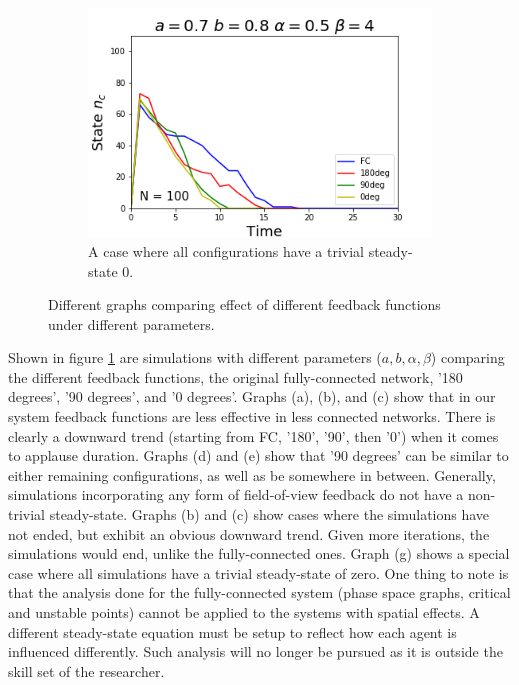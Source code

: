 \begin{figure}[h]
\begin{subfigure}[b]{0.3\linewidth}
    \includegraphics[width=\linewidth]{images/chapter4/feedback_sim7.png}
    \caption{A case where all configurations have a trivial steady-state $0$.}
  \end{subfigure}
  \caption{Different graphs comparing effect of different feedback functions under different parameters.}
  \label{fig:spacesim}
\end{figure}

Shown in figure \ref{fig:spacesim} are simulations with different parameters ($a,b,\alpha,\beta$) comparing the different feedback functions, the original fully-connected network, '180 degrees', '90 degrees', and '0 degrees'.
Graphs (a), (b), and (c) show that in our system feedback functions are less effective in less connected networks. 
There is clearly a downward trend (starting from FC, '180', '90', then '0') when it comes to applause duration.
Graphs (d) and (e) show that '90 degrees' can be similar to either remaining configurations, as well as be somewhere in between.
Generally, simulations incorporating any form of field-of-view feedback do not have a non-trivial steady-state.
Graphs (b) and (c) show cases where the simulations have not ended, but exhibit an obvious downward trend.
Given more iterations, the simulations would end, unlike the fully-connected ones.
Graph (g) shows a special case where all simulations have a trivial steady-state of zero.
One thing to note is that the analysis done for the fully-connected system (phase space graphs, critical and unstable points) cannot be applied to the systems with spatial effects.
A different steady-state equation must be setup to reflect how each agent is influenced differently.
Such analysis will no longer be pursued as it is outside the skill set of the researcher.

